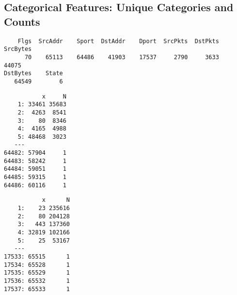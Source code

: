 \documentclass[12pt,twoside]{dukestatscithesis}
\theoremstyle{definition}
\theoremstyle{definition}
\theoremstyle{definition}
\theoremstyle{remark}
\begin{document}
\subsection{Categorical Features: Unique Categories and
Counts}\label{categorical-features-unique-categories-and-counts}
\begin{Shaded}
\begin{Highlighting}[]
\NormalTok{(}
\end{Highlighting}
\end{Shaded}
\begin{verbatim}
    Flgs  SrcAddr    Sport  DstAddr    Dport  SrcPkts  DstPkts SrcBytes 
      70    65113    64486    41903    17537     2790     3633    44075 
DstBytes    State 
   64549        6 
\end{verbatim}
\begin{Shaded}
\begin{Highlighting}[]
\StringTok{ }
  \StringTok{ }\NormalTok{(x)[, .N, keyby =}\StringTok{ }\NormalTok{x]}
  \NormalTok{dt[} \NormalTok{),]}
\NormalTok{\}}
\end{Highlighting}
\end{Shaded}
\begin{verbatim}
           x     N
    1: 33461 35683
    2:  4263  8541
    3:    80  8346
    4:  4165  4988
    5: 48468  3023
   ---            
64482: 57904     1
64483: 58242     1
64484: 59051     1
64485: 59315     1
64486: 60116     1
\end{verbatim}
\begin{Shaded}
\begin{Highlighting}[]
\end{Highlighting}
\end{Shaded}
\begin{verbatim}
           x      N
    1:    23 235616
    2:    80 204128
    3:   443 137360
    4: 32819 102166
    5:    25  53167
   ---             
17533: 65515      1
17534: 65528      1
17535: 65529      1
17536: 65532      1
17537: 65533      1
\end{verbatim}
\begin{Shaded}
\begin{Highlighting}[]
\end{Highlighting}
\end{Shaded}
\end{document}
